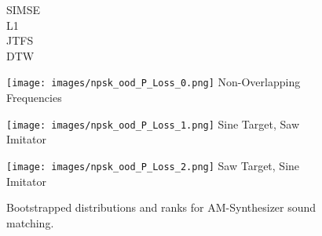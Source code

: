 \begin{figure*}[t]
  \centering
  \begin{minipage}[t]{\textwidth}
    \begin{minipage}[t]{0.045\textwidth}
      \footnotesize\raggedleft
      \vspace{-2.75cm} %
      SIMSE\\[0.4cm]
      L1\\[0.385cm]
      JTFS\\[0.365cm]
      DTW
    \end{minipage}%
    \hspace{0.01\textwidth}%
    \begin{minipage}[t]{0.91\textwidth}
      \centering
      \begin{minipage}[t]{0.31\textwidth}
        \centering
        \texttt{[image: images/npsk\_ood\_P\_Loss\_0.png]}
        \vspace{0.3em}
        \footnotesize Non-Overlapping Frequencies
      \end{minipage}
      \hspace{0.015\textwidth}%
      \begin{minipage}[t]{0.31\textwidth}
        \centering
        \texttt{[image: images/npsk\_ood\_P\_Loss\_1.png]}
        \vspace{0.3em}
        \footnotesize Sine Target, Saw Imitator
      \end{minipage}
      \hspace{0.01\textwidth}%
      \begin{minipage}[t]{0.31\textwidth}
        \centering
        \texttt{[image: images/npsk\_ood\_P\_Loss\_2.png]}
        \vspace{0.3em}
        \footnotesize Saw Target, Sine Imitator
      \end{minipage}
    \end{minipage}
  \end{minipage}
  \caption{Bootstrapped distributions and ranks for AM-Synthesizer sound matching.}
  \label{fig:npsk_am_synths}
\end{figure*}